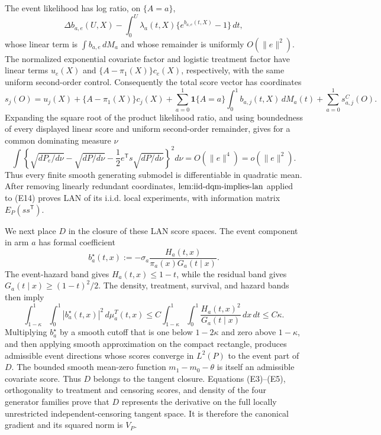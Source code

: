The event likelihood has log ratio, on \(\{A=a\}\),
\[
 \Delta b_{a,e}(U,X)-\int_0^U\lambda_a(t,X)
                  \{e^{b_{a,e}(t,X)}-1\}\,dt,
\]
whose linear term is \(\int b_{a,e}\,dM_a\) and whose remainder is uniformly \(O(\lVert e\rVert^2)\).  The normalized exponential covariate factor and logistic treatment factor have linear terms \(u_e(X)\) and \(\{A-\pi_1(X)\}c_e(X)\), respectively, with the same uniform second-order control.  Consequently the total score vector has coordinates
\[
 s_j(O)=u_j(X)+\{A-\pi_1(X)\}c_j(X)
 +\sum_{a=0}^1\mathbf 1\{A=a\}\int_0^1b_{a,j}(t,X)\,dM_a(t)
 +\sum_{a=0}^1s^C_{a,j}(O).                                           \tag{E13}
\]
Expanding the square root of the product likelihood ratio, and using boundedness of every displayed linear score and uniform second-order remainder, gives for a common dominating measure \(\nu\)
\[
 \int\left\{\sqrt{dP_e/d\nu}-\sqrt{dP/d\nu}
       -\frac12e^{\mathsf T}s\sqrt{dP/d\nu}\right\}^2d\nu
 =O(\lVert e\rVert^4)=o(\lVert e\rVert^2).                            \tag{E14}
\]
Thus every finite smooth generating submodel is differentiable in quadratic mean.  After removing linearly redundant coordinates, \(\textnormal{lem:iid-dqm-implies-lan}\) applied to (E14) proves LAN of its i.i.d. local experiments, with information matrix \(E_P(ss^{\mathsf T})\).

We next place \(D\) in the closure of these LAN score spaces.  The event component in arm \(a\) has formal coefficient
\[
 b_a^{\star}(t,x):=-\sigma_a\frac{H_a(t,x)}{\pi_a(x)G_a(t\mid x)}.
\]
The event-hazard band gives \(H_a(t,x)\le1-t\), while the residual band gives \(G_a(t\mid x)\ge(1-t)^2/2\).  The density, treatment, survival, and hazard bands then imply
\[
 \int_{1-\kappa}^1\!\int_0^1|b_a^{\star}(t,x)|^2\,d\mu_a^T(t,x)
 \le C\int_{1-\kappa}^1\!\int_0^1
             \frac{H_a(t,x)^2}{G_a(t\mid x)}\,dx\,dt
 \le C\kappa.                                                         \tag{E15}
\]
Multiplying \(b_a^{\star}\) by a smooth cutoff that is one below \(1-2\kappa\) and zero above \(1-\kappa\), and then applying smooth approximation on the compact rectangle, produces admissible event directions whose scores converge in \(L^2(P)\) to the event part of \(D\).  The bounded smooth mean-zero function \(m_1-m_0-\theta\) is itself an admissible covariate score.  Thus \(D\) belongs to the tangent closure.  Equations (E3)--(E5), orthogonality to treatment and censoring scores, and density of the four generator families prove that \(D\) represents the derivative on the full locally unrestricted independent-censoring tangent space.  It is therefore the canonical gradient and its squared norm is \(V_P\).

